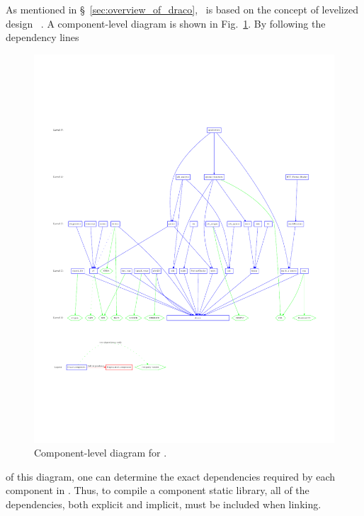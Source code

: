 As mentioned in \S~\ref{sec:overview_of_draco}, \draco\ is based on
the concept of levelized design~\cite{la96} .  A component-level diagram
is shown in Fig.~\ref{fig:level}.  By following the dependency lines
\begin{figure}
  \centerline{\includegraphics[clip,trim=1cm 4cm 0cm 4cm, width=7.5in, angle=90]{fig/level}} %
  \caption{Component-level diagram for \draco.}
  \label{fig:level}
\end{figure}
of this diagram, one can determine the exact dependencies required by
each component in \draco.  Thus, to compile a component static library, all of
the dependencies, both explicit and implicit, must be included when linking.

